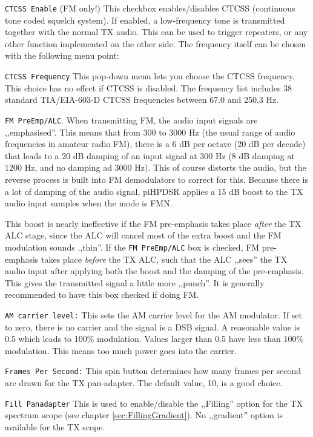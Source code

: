 \documentclass[12pt]{book}
\def\rett#1{\texttt{\color{red}#1}}
\begin{document}
\rett{CTCSS Enable} (FM only!) This checkbox enables/disables CTCSS (continuous tone coded squelch system).
If enabled, a low-frequency
tone is transmitted together with the normal TX audio. This can be used to trigger repeaters, or any other
function implemented
on the other side. The frequency itself can be chosen with the following menu point:

\rett{CTCSS Frequency} This pop-down menu lets you choose the CTCSS frequency. This choice has no effect if
CTCSS is disabled.
The frequency list includes 38 standard TIA/EIA-603-D CTCSS frequencies between 67.0 and 250.3 Hz.

\rett{FM PreEmp/ALC}. When transmitting FM, the audio input signals are ,,emphasised''.
This means that from 300 to 3000 Hz (the usual range of audio frequencies in amateur
radio FM), there is a 6 dB per octave (20 dB per decade) that leads to a 20 dB damping
of an input signal at 300 Hz (8 dB damping at 1200 Hz, and no damping ad 3000 Hz).
This of course distorts the audio, but the reverse process is built into FM demodulators
to correct for this. Because there is a lot of damping of the audio signal, piHPDSR
applies a 15 dB boost to the TX audio input samples when the mode is FMN.

This boost is nearly ineffective if the FM pre-emphasis takes place \textit{after}
the TX ALC stage, since the ALC will cancel most of the extra boost and the FM
modulation sounds ,,thin''. If the \rett{FM PreEmp/ALC} box is checked, FM
pre-emphasis takes place \textit{before} the TX ALC, such that the ALC ,,sees''
the TX audio input after applying both the boost and the damping of the pre-emphasis. This gives the
transmitted signal a little more ,,punch''. It is generally recommended to have this box checked
if doing FM.

\rett{AM carrier level:} This sets the AM carrier level for the AM modulator. If set to zero, there is no
carrier and the
signal is a DSB signal. A reasonable value is 0.5 which leads to 100\% modulation. Values larger than
0.5 have less than 100\% modulation. This means too much power goes into the carrier.

\rett{Frames Per Second:} This spin button determines how many frames per second are drawn for the TX
pan-adapter. The default value, 10, is a good choice.

\rett{Fill Panadapter} This is used to enable/disable the ,,Filling'' option
for the TX  spectrum scope (see chapter \ref{sec:FillingGradient}). No ,,gradient''
option is available for the TX scope.
\end{document}
